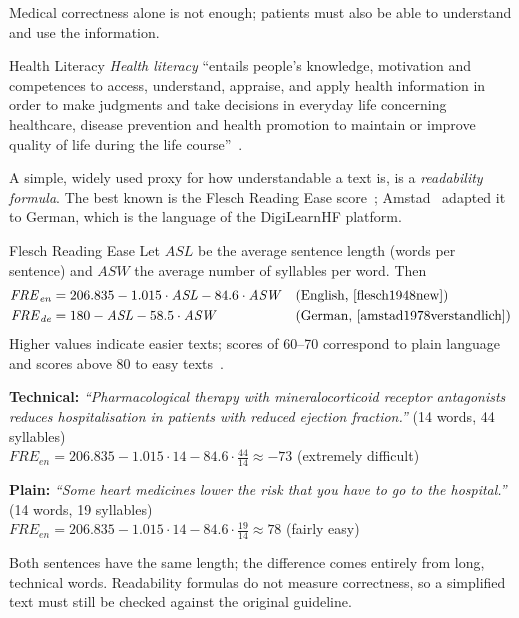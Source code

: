 Medical correctness alone is not enough; patients must also be able to
understand and use the information.

\begin{bgdefinition}{Health Literacy}
\emph{Health literacy} ``entails people's knowledge, motivation and
competences to access, understand, appraise, and apply health information in
order to make judgments and take decisions in everyday life concerning
healthcare, disease prevention and health promotion to maintain or improve
quality of life during the life course''~\cite{sorensen2012health}.
\end{bgdefinition}

A simple, widely used proxy for how understandable a text is, is a
\emph{readability formula}. The best known is the Flesch Reading Ease
score~\cite{flesch1948new}; Amstad~\cite{amstad1978verstandlich} adapted it to
German, which is the language of the DigiLearnHF platform.

\begin{bgdefinition}{Flesch Reading Ease}
Let $\mathit{ASL}$ be the average sentence length (words per sentence) and
$\mathit{ASW}$ the average number of syllables per word. Then
\begin{align*}
  \mathit{FRE}_{\mathit{en}} &= 206.835 - 1.015 \cdot \mathit{ASL} - 84.6 \cdot \mathit{ASW}
     &&\text{(English,~\cite{flesch1948new})}\\
  \mathit{FRE}_{\mathit{de}} &= 180 - \mathit{ASL} - 58.5 \cdot \mathit{ASW}
     &&\text{(German,~\cite{amstad1978verstandlich})}
\end{align*}
Higher values indicate easier texts; scores of 60--70 correspond to plain
language and scores above 80 to easy texts~\cite{flesch1948new}.
\end{bgdefinition}

\begin{bgexample}
\textbf{Technical:} \emph{``Pharmacological therapy with mineralocorticoid
receptor antagonists reduces hospitalisation in patients with reduced
ejection fraction.''} (14 words, 44 syllables) \\
$\mathit{FRE}_{\mathit{en}} = 206.835 - 1.015\cdot 14 - 84.6\cdot\frac{44}{14} \approx -73$
\;(extremely difficult)\par\smallskip
\textbf{Plain:} \emph{``Some heart medicines lower the risk that you have to
go to the hospital.''} (14 words, 19 syllables) \\
$\mathit{FRE}_{\mathit{en}} = 206.835 - 1.015\cdot 14 - 84.6\cdot\frac{19}{14} \approx 78$
\;(fairly easy)\par\smallskip
Both sentences have the same length; the difference comes entirely from long,
technical words. Readability formulas do not measure correctness, so a
simplified text must still be checked against the original guideline.
\end{bgexample}


